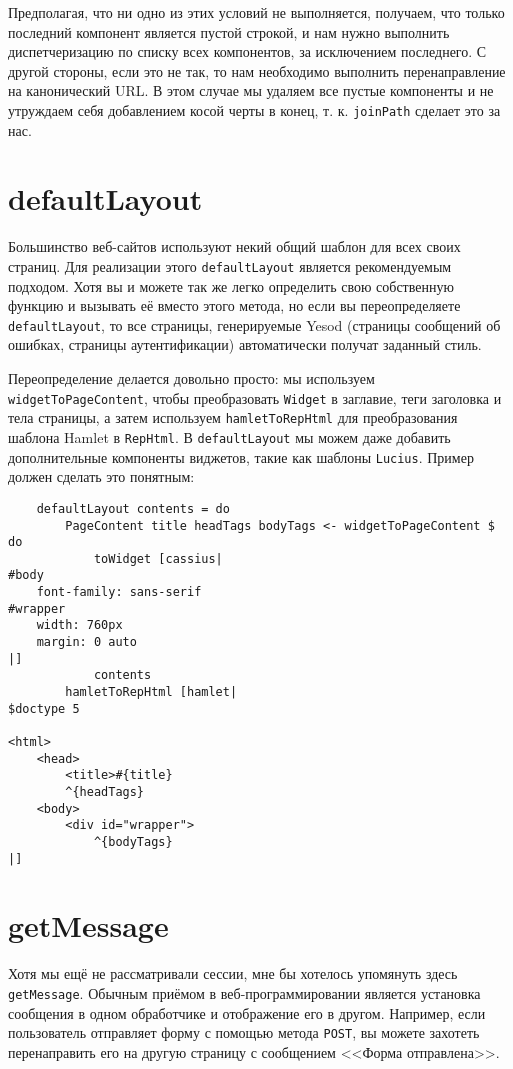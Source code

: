 Предполагая, что ни одно из этих условий не выполняется, получаем, что только
последний компонент является пустой строкой, и нам нужно выполнить
диспетчеризацию по списку всех компонентов, за исключением последнего. С другой
стороны, если это не так, то нам необходимо выполнить перенаправление на
канонический URL. В этом случае мы удаляем все пустые компоненты и не утруждаем
себя добавлением косой черты в конец, т. к. \lstinline!joinPath! сделает это за
нас.

\section {defaultLayout}

Большинство веб-сайтов используют некий общий шаблон для всех своих страниц.
Для реализации этого \lstinline!defaultLayout! является рекомендуемым подходом.
Хотя вы и можете так же легко определить свою собственную функцию и вызывать её
вместо этого метода, но если вы переопределяете \lstinline!defaultLayout!, то
все страницы, генерируемые Yesod (страницы сообщений об ошибках, страницы
аутентификации) автоматически получат заданный стиль.

Переопределение делается довольно просто: мы используем
\lstinline!widgetToPageContent!, чтобы преобразовать \lstinline!Widget! в
заглавие, теги заголовка и тела страницы, а затем используем
\lstinline!hamletToRepHtml! для преобразования шаблона Hamlet в
\lstinline!RepHtml!. В \lstinline!defaultLayout! мы можем даже добавить
дополнительные компоненты виджетов, такие как шаблоны \lstinline!Lucius!.
Пример должен сделать это понятным:

\begin{lstlisting}
    defaultLayout contents = do
        PageContent title headTags bodyTags <- widgetToPageContent $ do
            toWidget [cassius|
#body
    font-family: sans-serif
#wrapper
    width: 760px
    margin: 0 auto
|]
            contents
        hamletToRepHtml [hamlet|
$doctype 5

<html>
    <head>
        <title>#{title}
        ^{headTags}
    <body>
        <div id="wrapper">
            ^{bodyTags}
|]
\end{lstlisting}%

\section {getMessage}

Хотя мы ещё не рассматривали сессии, мне бы хотелось упомянуть здесь
\lstinline!getMessage!. Обычным приёмом в веб-программировании является
установка сообщения в одном обработчике и отображение его в другом. Например,
если пользователь отправляет форму с помощью метода \lstinline!POST!, вы можете
захотеть перенаправить его на другую страницу с сообщением <<Форма
отправлена>>.

